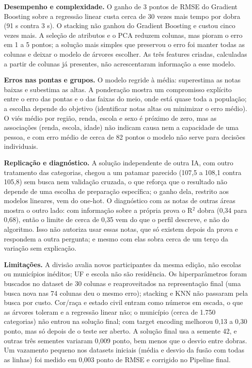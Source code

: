 \documentclass[conference,a4paper]{IEEEtran}
\begin{document}
\textbf{Desempenho e complexidade.} O ganho de 3 pontos de RMSE do Gradient Boosting sobre a regressão linear custa cerca de 30 vezes mais tempo por dobra (91 s contra 3 s). O stacking não ganhou do Gradient Boosting e custou cinco vezes mais. A seleção de atributos e o PCA reduzem colunas, mas pioram o erro em 1 a 5 pontos; a solução mais simples que preservou o erro foi manter todas as colunas e deixar o modelo de árvores escolher. As três features criadas, calculadas a partir de colunas já presentes, não acrescentaram informação a esse modelo.

\textbf{Erros nas pontas e grupos.} O modelo regride à média: superestima as notas baixas e subestima as altas. A ponderação mostra um compromisso explícito entre o erro das pontas e o das faixas do meio, onde está quase toda a população; a escolha depende do objetivo (identificar notas altas ou minimizar o erro médio). O viés médio por região, renda, escola e sexo é próximo de zero, mas as associações (renda, escola, idade) não indicam causa nem a capacidade de uma pessoa, e com erro médio de cerca de 82 pontos o modelo não serve para decisões individuais.

\textbf{Replicação e diagnóstico.} A solução independente de outra IA, com outro tratamento das categorias, chegou a um patamar parecido (107,5 a 108,1 contra 105,8) sem busca nem validação cruzada, o que reforça que o resultado não depende de uma escolha de preparação específica; o ganho dela, restrito aos modelos lineares, vem do one-hot. O diagnóstico com as notas de outras áreas mostra o outro lado: com informação sobre a própria prova o R$^2$ dobra (0,34 para 0,68), então o limite de cerca de 0,35 vem do que o perfil descreve, e não do algoritmo. Isso não autoriza usar essas notas, que só existem depois da prova e respondem a outra pergunta; e mesmo com elas sobra cerca de um terço da variação sem explicação.

\textbf{Limitações.} A divisão avalia novos participantes da mesma edição, não escolas ou municípios inéditos; UF e escola não são residência. Os hiperparâmetros foram buscados no dataset de 30 colunas e reaproveitados na representação final (uma busca nova nas 74 colunas deu o mesmo erro); stacking e KNN não passaram pela busca por custo. Cor/raça e estado civil entram como números em escada, o que as árvores toleram e a regressão linear não; o município (cerca de 1.750 categorias) não entrou na solução final; com target encoding melhorou 0,13 a 0,30 ponto, mas só depois de o teste ser aberto. A solução final usa a semente 42, e outras três sementes variaram 0,009 ponto, bem menos que o desvio entre dobras. Um vazamento pequeno nos datasets iniciais (média e desvio da fusão com todas as linhas) foi medido em 0,003 ponto de RMSE e corrigido no Pipeline final.
\end{document}
